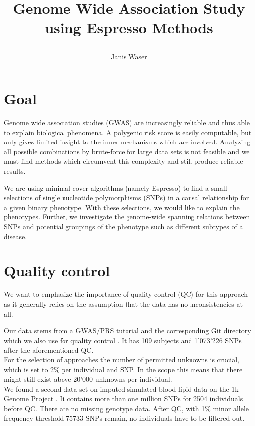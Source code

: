 \documentclass[letterpaper, 11pt]{article}
\title{	

Genome Wide Association Study using Espresso Methods
}
\author{ Janis Waser}
\begin{document}
\maketitle




\section{Goal}
\label{sec:goal}
Genome wide association studies  (GWAS) are increasingly reliable and thus able to explain biological phenomena. A polygenic risk score is easily computable, but only gives limited insight to the inner mechanisms which are involved. Analyzing all possible combinations by brute-force for large data sets is not feasible and we must find methods which circumvent this complexity and still produce reliable results.

We are using minimal cover algorithms (namely Espresso) to find a small selections of single nucleotide polymorphisms (SNPs) in a causal relationship for a given binary phenotype.  With these selections, we would like to explain the phenotypes.  Further, we investigate the genome-wide spanning relations between SNPs and potential groupings of the phenotype such as different subtypes of a disease. 


\tableofcontents
\newpage
\section {Quality control}
We want to emphasize the importance of quality control (QC) for this approach as it generally relies on the assumption that the data has no inconsistencies at all. 

Our data stems from a GWAS/PRS tutorial and the corresponding Git directory which we also use for quality control \cite{tutorial}. It has 109 subjects and 1'073'226 SNPs after the aforementioned QC.  \\


For the selection of approaches the number of permitted unknowns is crucial, which is set to 2\% per individual and SNP. In the scope this means that there might still exist above 20'000 unknowns per individual. \\

We found a second data set on imputed simulated blood lipid data on the 1k Genome Project \cite{1k}. It contains more than one million SNPs for 2504 individuals before QC. There are no missing genotype data. After QC, with 1\% minor allele frequency threshold 75733 SNPs remain, no individuals have to be filtered out.
\end{document}
